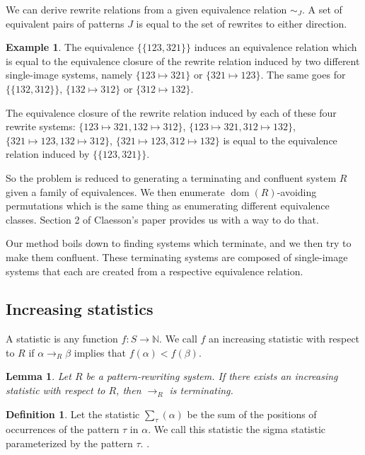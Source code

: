 \documentclass[openany, a4paper, 11pt, english]{article}
\newcommand{\patternrule}{ \mapsto \!}
\newtheorem{lemma}[theorem]{Lemma}
\theoremstyle{definition}
\newtheorem{definition}[theorem]{Definition}
\newtheorem{example}[theorem]{Example}
\newcommand{\Sym}{S}
\DeclareMathOperator{\dom}{dom}
\begin{document}
We can derive rewrite relations from a given equivalence relation $\sim_J$.
A set of equivalent pairs of patterns $J$ is equal to the set of rewrites to
either direction. 
\begin{example}
    The equivalence $\{ \{123, 321 \} \}$ induces an equivalence relation which is
    equal to the equivalence closure of the rewrite relation induced by two
    different single-image systems, namely $\{123 \patternrule 321\}$ or $\{321
    \patternrule 123\}$. The same goes for $\{ \{ 132, 312 \} \}$, $\{132 \patternrule
    312\}$ or $\{312 \patternrule 132\}$.

    The equivalence closure of the rewrite relation induced by each of these
    four rewrite systems: $\{123 \patternrule 321, 132 \patternrule 312\}$, $\{123
    \patternrule 321, 312 \patternrule 132\}$, $\{321 \patternrule 123, 132
    \patternrule 312\}$, $\{321 \patternrule 123, 312 \patternrule 132\}$ is
    equal to the equivalence relation induced by $\{ \{ 123, 321 \} \}$.
\end{example}

So the problem is reduced to generating a terminating and confluent system $R$
given a family of equivalences. We then enumerate $\dom(R)$-avoiding
permutations which is the same thing as enumerating different equivalence
classes.  Section 2 of Claesson's paper provides us with a way to do that.
\cite{claesson:2021}

Our method boils down to finding systems which terminate, and we then try to
make them confluent.  These terminating systems are composed of single-image
systems that each are created from a respective equivalence relation.

\subsection{Increasing statistics}
A statistic is any function $f : \Sym \to \mathbb{N}$. We call $f$ an increasing
statistic with respect to $R$ if $\alpha \to_R \beta$ implies that $f(\alpha) < f(\beta)$.

\begin{lemma}
    Let $R$ be a pattern-rewriting system. If there exists an increasing
    statistic with respect to $R$, then $\to_R$ is terminating.    
\end{lemma}

\begin{definition}
    Let the statistic $\sum_\tau(\alpha)$ be the sum of the positions of occurrences of
    the pattern $\tau$ in $\alpha$. We call this statistic the sigma statistic
    parameterized by the pattern $\tau$.
    \cite{claesson:2021}.
\end{definition}
\end{document}
